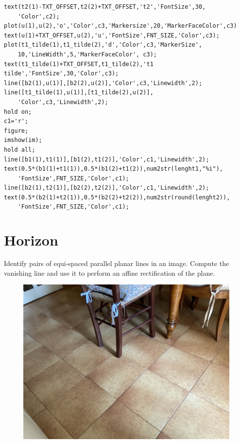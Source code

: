 \documentclass[12pt, a4paper]{report}
\begin{document}
\begin{lstlisting}
text(t2(1)-TXT_OFFSET,t2(2)+TXT_OFFSET,'t2','FontSize',30,
    'Color',c2);
plot(u(1),u(2),'o','Color',c3,'Markersize',20,'MarkerFaceColor',c3)
text(u(1)+TXT_OFFSET,u(2),'u','FontSize',FNT_SIZE,'Color',c3);
plot(t1_tilde(1),t1_tilde(2),'d','Color',c3,'MarkerSize',
    10,'LineWidth',5,'MarkerFaceColor', c3);
text(t1_tilde(1)+TXT_OFFSET,t1_tilde(2),'t1 tilde','FontSize',30,'Color',c3);
line([b2(1),u(1)],[b2(2),u(2)],'Color',c3,'Linewidth',2);
line([t1_tilde(1),u(1)],[t1_tilde(2),u(2)],
    'Color',c3,'Linewidth',2);
hold on;
c1='r';
figure;
imshow(im);
hold all;
line([b1(1),t1(1)],[b1(2),t1(2)],'Color',c1,'Linewidth',2);
text(0.5*(b1(1)+t1(1)),0.5*(b1(2)+t1(2)),num2str(lenght1,"%i"),
    'FontSize',FNT_SIZE,'Color',c1);
line([b2(1),t2(1)],[b2(2),t2(2)],'Color',c1,'Linewidth',2);
text(0.5*(b2(1)+t2(1)),0.5*(b2(2)+t2(2)),num2str(round(lenght2)),
    'FontSize',FNT_SIZE,'Color',c1);
        \end{lstlisting} 

        \newpage 
    
        \section{Horizon}
        Identify pairs of equi-spaced parallel planar lines in an image. Compute the vanishing line and use it to perform an affine rectification of the plane.
        \begin{figure}[H]
            \centering
            \includegraphics[width=0.75\linewidth]{images/floor.png}
        \end{figure}
\end{document}
